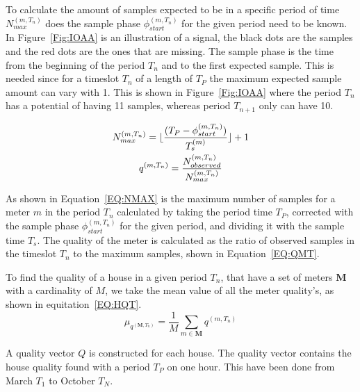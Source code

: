 To calculate the amount of samples expected to be in a specific period of time $N_{max}^{(m,T_n)}$ does the sample phase $\phi_{start}^{(m,T_n)}$ for the given period need to be known. In Figure~\ref{Fig:IOAA} is an illustration of a signal, the black dots are the samples and the red dots are the ones that are missing. The sample phase is the time from the beginning of the period $T_n$ and to the first expected sample. This is needed since for a timeslot $T_n$ of a length of $T_P$ the maximum expected sample amount can vary with 1. This is shown in Figure~\ref{Fig:IOAA} where the period $T_n$ has a potential of having 11 samples, whereas period $T_{n+1}$ only can have 10.

\begin{gather}
		N_{max}^{(m,T_n)} = \lfloor \frac{(T_{P}-\phi_{start}^{(m,T_n)})}{T_s^{(m)}}\rfloor + 1 \label{EQ:NMAX} \\
		q^{(m,T_n)} = \frac{N_{observed}^{(m,T_n)}}{ N_{max}^{(m,T_n)} } \label{EQ:QMT}
\end{gather}

As shown in Equation~\ref{EQ:NMAX} is the maximum number of samples for a meter $m$ in the period $T_n$ calculated by taking the period time $T_P$, corrected with the sample phase $\phi_{start}^{(m,T_n)}$ for the given period, and dividing it with the sample time $T_s$. The  quality of the meter is calculated as the ratio of observed samples in the timeslot $T_n$ to the maximum samples, shown in Equation~\ref{EQ:QMT}. 

To find the quality of a house in a given period $T_n$, that have a set of meters $\mathbf{M}$ with a cardinality of $M$, we take the mean value of all the meter quality's, as shown in equitation~\ref{EQ:HQT}.  
\begin{equation}
	\mu_{q^{(\mathbf{M},T_n)}} = \frac{1}{M} \sum_{m \in \mathbf{M}} q^{(m,T_n)}
	\label{EQ:HQT}
\end{equation}

A quality vector $Q$ is constructed for each house. The quality vector contains the house quality found with a period $T_P$ on one hour. This have been done from March $T_1$ to October $T_N$. 

